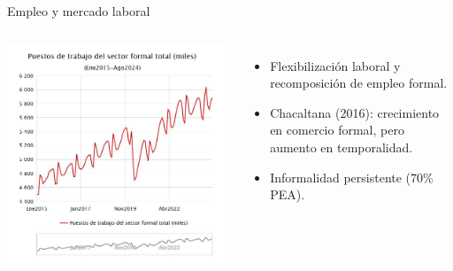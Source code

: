 \documentclass[aspectratio=169]{beamer}
\begin{document}
\begin{frame}{\Large Empleo y mercado laboral}
    \begin{columns}
            \includegraphics[width=\textwidth]{images/trabajo_formal.jpg}
            \Large
            \begin{itemize}
                \item Flexibilización laboral y recomposición de empleo formal.
                \item Chacaltana (2016): crecimiento en comercio formal, pero aumento en temporalidad.
                \item Informalidad persistente (70\% PEA).
            \end{itemize}
    \end{columns}
\end{frame}
\end{document}
